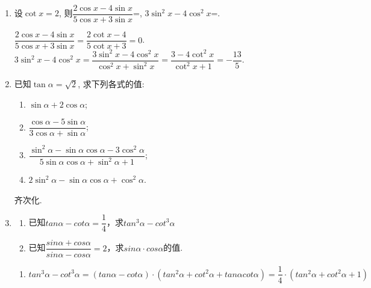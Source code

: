 \begin{enumerate}
    \item 设$\cot{x}=2$, 则$\dfrac{2\cos{x}-4\sin{x}}{5\cos{x}+3\sin{x}}$=, 
    $3\sin^2x-4\cos^2x$=. 
    \begin{jieda}
    $\dfrac{2\cos{x}-4\sin{x}}{5\cos{x}+3\sin{x}}=\dfrac{2\cot{x}-4}{5\cot{x}+3}=0$. \\
    $3\sin^2x-4\cos^2x=\dfrac{3\sin^2x-4\cos^2x}{\cos^2x+\sin^2x}=\dfrac{3-4\cot^2x}{\cot^2x+1}=-\dfrac{13}{5}$. 
    \end{jieda}
    \item 已知$\tan\alpha=\sqrt{2}$, 求下列各式的值:
    \begin{enumerate}[(1)]
    \item $\sin\alpha+2\cos\alpha$; 
    \item $\dfrac{\cos\alpha-5\sin\alpha}{3\cos\alpha+\sin\alpha}$; 
    \item $\dfrac{\sin^2\alpha-\sin\alpha\cos\alpha-3\cos^2\alpha}{5\sin\alpha\cos\alpha+\sin^2\alpha+1}$; 
    \item $2\sin^2\alpha-\sin\alpha\cos\alpha+\cos^2\alpha$. 
    \end{enumerate}
    \begin{jieda}
    齐次化. \\
    \end{jieda}
    \item \begin{enumerate}
        \item 已知$tan\alpha - cot\alpha = \dfrac{1}{4}$，求$tan^3\alpha - cot^3\alpha$
        \item 已知$\dfrac{sin\alpha + cos\alpha}{sin\alpha - cos\alpha} = 2$，求$sin\alpha \cdot cos\alpha$的值.
    \end{enumerate}
    \begin{jieda}
        \begin{enumerate}
            \item $tan^3\alpha - cot^3\alpha = (tan\alpha - cot\alpha) \cdot (tan^2\alpha + cot^2\alpha + tan\alpha cot\alpha) = \dfrac{1}{4} \cdot (tan^2\alpha + cot^2\alpha + 1)$ \\

\end{enumerate}
\end{jieda}
\end{enumerate}
